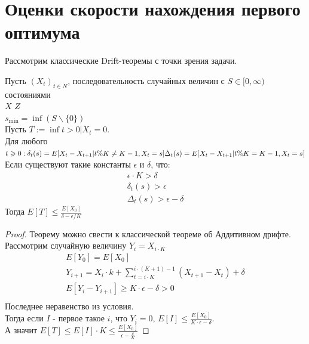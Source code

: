 \documentclass[times,specification,annotation]{itmo-student-thesis}
\begin{document}
    \section{Оценки скорости нахождения первого оптимума}
    Рассмотрим классические Drift-теоремы с точки зрения задачи.
    \begin{theorem}
        \label{drift:add}
        Пусть $(X_t)_{t \in N}$, последовательность случайных величин с $S \in [0, \infty)$ состояниями\\
        $X$ \in $Z$ \\
        $s_{\min} = \inf(S \backslash \{0\})$ \\
        Пусть $T := \inf{t > 0 | X_t = 0}$. \\
        Для любого $t \geq 0 : \\
        \delta_t(s) = E[X_t - X_{t + 1}| t \% K \neq K - 1, X_t = s]\\
        \Delta_t(s) = E[X_t - X_{t + 1}| t \% K = K - 1, X_t = s]$\\
        Если существуют такие константы $\epsilon$ и $\delta$, что:\\
        \begin{gather*}
            \epsilon \cdot K > \delta \\
            \delta_t(s) > \epsilon \\
            \Delta_t(s) > \epsilon - \delta
        \end{gather*}
        Тогда $E[T] \leq \frac{E[X_0]}{\delta - \epsilon/K}$  \\
    \end{theorem}
    \begin{proof}
        Теорему можно свести к классической теореме об Аддитивном дрифте. %
        Рассмотрим случайную величину $Y_i = X_{i \cdot K}$
        \begin{gather*}
            E[Y_0] = E[X_0] \\
            Y_{i + 1} = X_i \cdot k + \sum_{t=i \cdot K}^{i \cdot (K + 1) - 1} (X_{t + 1} - X_{t}) + \delta \\
            E[Y_i - Y_{i + 1}] \geq  K \cdot \epsilon - \delta > 0 \\
        \end{gather*}
        Последнее неравенство из условия. \\
        Тогда если $I$ - первое такое $i$, что $Y_i = 0$, $E[I] \leq \frac{E[X_0]}{K \cdot \epsilon - \delta}$. \\
        А значит $E[T] \leq E[I] \cdot K \leq \frac{E[X_0]}{\epsilon - \frac{\delta}{K}}$
    \end{proof}
\end{document}
